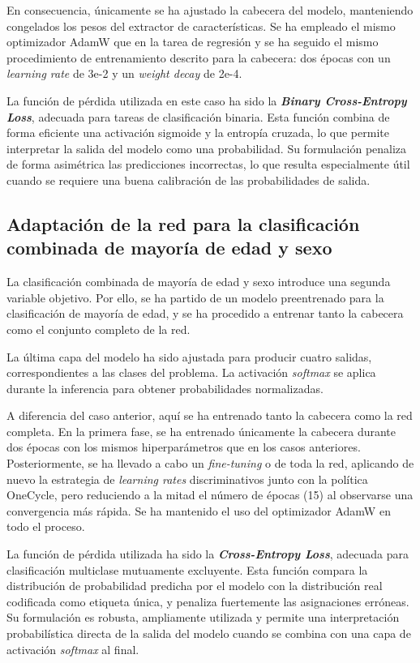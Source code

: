 En consecuencia, únicamente se ha ajustado la cabecera del modelo, manteniendo congelados los pesos del 
extractor de características. Se ha empleado el mismo optimizador AdamW que en la tarea de regresión y se ha 
seguido el mismo procedimiento de entrenamiento descrito para la cabecera: dos épocas con un 
\textit{learning rate} de 3e-2 y un \textit{weight decay} de 2e-4.

La función de pérdida utilizada en este caso ha sido la \textbf{\textit{Binary Cross-Entropy Loss}}, 
adecuada para tareas de clasificación binaria. Esta función combina de forma eficiente una activación 
sigmoide y la entropía cruzada, lo que permite interpretar la salida del modelo como una probabilidad. 
Su formulación penaliza de forma asimétrica las predicciones incorrectas, lo 
que resulta especialmente útil cuando se requiere una buena calibración de las probabilidades de salida.


\subsection{Adaptación de la red para la clasificación combinada de mayoría de edad y sexo}

La clasificación combinada de mayoría de edad y sexo introduce una segunda variable objetivo. Por ello, se 
ha partido de un modelo preentrenado para la clasificación de mayoría de edad, y se ha procedido a entrenar 
tanto la cabecera como el conjunto completo de la red.

La última capa del modelo ha sido ajustada para producir cuatro salidas, correspondientes a las clases del 
problema. 
La activación \textit{softmax} se aplica durante la inferencia para obtener probabilidades normalizadas.

A diferencia del caso anterior, aquí se ha entrenado tanto la cabecera como la red completa. En la primera 
fase, se ha entrenado únicamente la cabecera durante dos épocas con los mismos hiperparámetros que en los 
casos anteriores. Posteriormente, se ha llevado a cabo un \textit{fine-tuning } o de toda la red, aplicando 
de nuevo la estrategia de \textit{learning rates} discriminativos junto con la política OneCycle, pero 
reduciendo a la mitad el número de épocas (15) al observarse una convergencia más rápida.
Se ha mantenido el uso del optimizador AdamW en todo el proceso.

La función de pérdida utilizada ha sido la \textbf{\textit{Cross-Entropy Loss}}, adecuada para clasificación 
multiclase mutuamente excluyente. Esta función compara la distribución de probabilidad predicha por el modelo 
con la distribución real codificada como etiqueta única, y penaliza fuertemente las asignaciones erróneas. 
Su formulación es robusta, ampliamente utilizada y permite una interpretación probabilística directa de la 
salida del modelo cuando se combina con una capa de activación \textit{softmax} al final.

